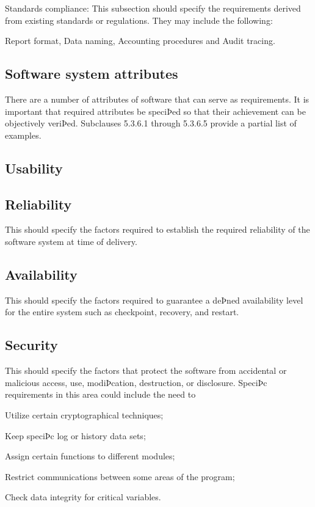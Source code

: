 		Standards compliance: This subsection should specify the requirements derived from existing standards or regulations. They may include the following: 
		
		Report format, Data naming, Accounting procedures and Audit tracing.
	
	\subsection{Software system attributes}
		There are a number of attributes of software that can serve as requirements. It is important that required attributes be speciÞed so that their achievement can be objectively veriÞed. Subclauses 5.3.6.1 through 5.3.6.5 provide a partial list of examples.
	
	\subsection{Usability}

	\subsection{Reliability}
		This should specify the factors required to establish the required reliability of the software system at time of delivery.
	
	\subsection{Availability}
		This should specify the factors required to guarantee a deÞned availability level for the entire system such as checkpoint, recovery, and restart. 
	
	\subsection{Security}
		This should specify the factors that protect the software from accidental or malicious access, use, modiÞcation, destruction, or disclosure. SpeciÞc requirements in this area could include the need to
		
		Utilize certain cryptographical techniques; 
		
		Keep speciÞc log or history data sets;
		
		Assign certain functions to different modules;
		
		Restrict communications between some areas of the program;
		
		Check data integrity for critical variables.
	
